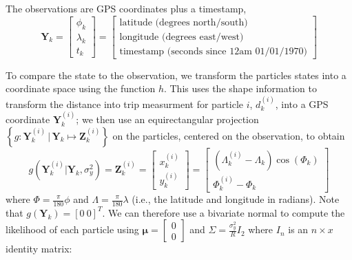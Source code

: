\documentclass[14paper,twoside]{article}
\newcommand{\bY}{\mathbf{Y}}
\newcommand{\bZ}{\mathbf{Z}}
\newcommand{\g}[1]{g\left(#1\right)}
\begin{document}
The observations are GPS coordinates plus a timestamp,
\begin{equation}
  \label{eq:vehicle_observation}
  \bY_k =
  \begin{bmatrix}
    \phi_k \\ \lambda_k \\ t_k
  \end{bmatrix} =
  \left[
    \begin{array}{l}
      \text{latitude (degrees north/south)} \\
      \text{longitude (degrees east/west)} \\
      \text{timestamp (seconds since 12am 01/01/1970)}
    \end{array}
  \right]
\end{equation}


To compare the state to the observation, 
we transform the particles states into a coordinate space using the function $h$.
This uses the shape information to transform the distance into trip measurment for particle $i$, $d_k^{(i)}$,
into a GPS coordinate $\bY_k^{(i)}$;
we then use an equirectangular projection 
$\left\{g : \bY_k^{(i)} \,|\, \bY_k \mapsto \bZ_k^{(i)} \right\}$ 
on the particles, centered on the observation, to obtain 
\begin{equation}
  \label{eq:transform}
  \g{\bY_k^{(i)} | \bY_k, \sigma^2_y} = \bZ_k^{(i)} =
  \begin{bmatrix}
    x_k^{(i)} \\ y_k^{(i)}
  \end{bmatrix} =
  \begin{bmatrix}
    \left( \Lambda_k^{(i)} - \Lambda_k \right) \cos \left( \Phi_k \right) \\
    \Phi_k^{(i)} - \Phi_k
  \end{bmatrix}
\end{equation}
where $\Phi = \frac{\pi}{180} \phi$ and $\Lambda = \frac{\pi}{180} \lambda$ 
(i.e., the latitude and longitude in radians).
Note that $g(\bY_k) = \left[0\ 0\right]^T$.
We can therefore use a bivariate normal to compute the likelihood of each particle
using $\boldsymbol{\mu} = \begin{bmatrix} 0 \\ 0 \end{bmatrix}$
and $\Sigma = \frac{\sigma^2_y}{R} I_2$ where $I_n$ is an $n\times x$ identity matrix:
\end{document}
